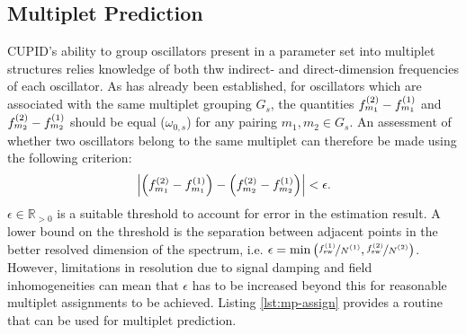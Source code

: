 \subsection{Multiplet Prediction}
\label{subsec:mp-selection}
\ac{CUPID}'s ability to group oscillators present in a parameter set into
multiplet structures relies knowledge of both thw indirect- and
direct-dimension frequencies of each oscillator. As has already been
established, for oscillators which are associated with the same multiplet
grouping $G_s$, the quantities $f^{(2)}_{m_1} - f^{(1)}_{m_1}$ and $f^{(2)}_{m_2} -
f^{(1)}_{m_2}$ should be equal ($\omega_{0,s}$) for any pairing  $m_1, m_2 \in
G_s$. An assessment of whether two oscillators belong to the same multiplet can
therefore be made using the following criterion:
\begin{equation}
    \left \lvert
        \left( f^{(2)}_{m_1} - f^{(1)}_{m_1} \right) -
        \left( f^{(2)}_{m_2} - f^{(1)}_{m_2} \right)
    \right \rvert < \epsilon.
\end{equation}
$\epsilon \in \mathbb{R}_{>0}$ is a suitable threshold to account for error in
the estimation result. A lower bound on the threshold is the separation between
adjacent points in the better resolved dimension of the spectrum, i.e.
$\epsilon = \min\left(\nicefrac{\fswone}{\None},
\nicefrac{\fswtwo}{\Ntwo}\right)$.  However, limitations in resolution due to
signal damping and field inhomogeneities can mean that $\epsilon$ has to be
increased beyond this for reasonable multiplet assignments to be achieved.
Listing \ref{lst:mp-assign} provides a \Python routine that can be used for multiplet
prediction.

